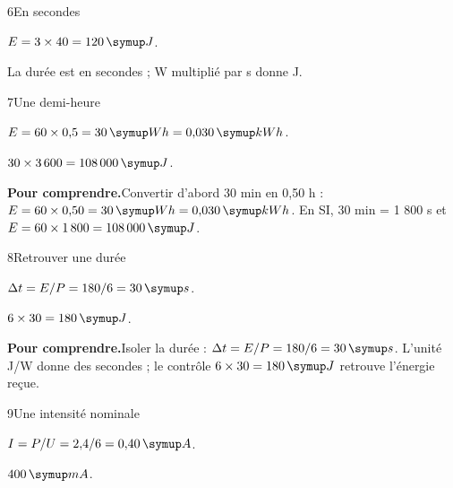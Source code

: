 \par\noindent\begin{minipage}{\linewidth}
\begin{corrige}{6}{En secondes}
\begin{questions}
\item $E=3\times40=120\unite J$.
\item La durée est en secondes ; W multiplié par s donne J.
\end{questions}
\end{corrige}
\end{minipage}
\par\noindent\begin{minipage}{\linewidth}
\begin{corrige}{7}{Une demi-heure}
\begin{questions}
\item $E=60\times0{,}5=30\unite{Wh}=0{,}030\unite{kWh}$.
\item $30\times3\,600=108\,000\unite J$.
\end{questions}
\par\smallskip\noindent\textbf{Pour comprendre.}\enspace Convertir d’abord 30 min en 0,50 h : $E=60\times0{,}50=30\unite{Wh}=0{,}030\unite{kWh}$. En SI, 30 min = 1 800 s et $E=60\times1\,800=108\,000\unite J$.\par
\end{corrige}
\end{minipage}
\par\noindent\begin{minipage}{\linewidth}
\begin{corrige}{8}{Retrouver une durée}
\begin{questions}
\item $\Delta t=E/P=180/6=30\unite s$.
\item $6\times30=180\unite J$.
\end{questions}
\par\smallskip\noindent\textbf{Pour comprendre.}\enspace Isoler la durée : $\Delta t=E/P=180/6=30\unite s$. L’unité J/W donne des secondes ; le contrôle $6\times30=180\unite J$ retrouve l’énergie reçue.\par
\end{corrige}
\end{minipage}
\par\noindent\begin{minipage}{\linewidth}
\begin{corrige}{9}{Une intensité nominale}
\begin{questions}
\item $I=P/U=2{,}4/6=0{,}40\unite A$.
\item $400\unite{mA}$.
\end{questions}
\end{corrige}
\end{minipage}
